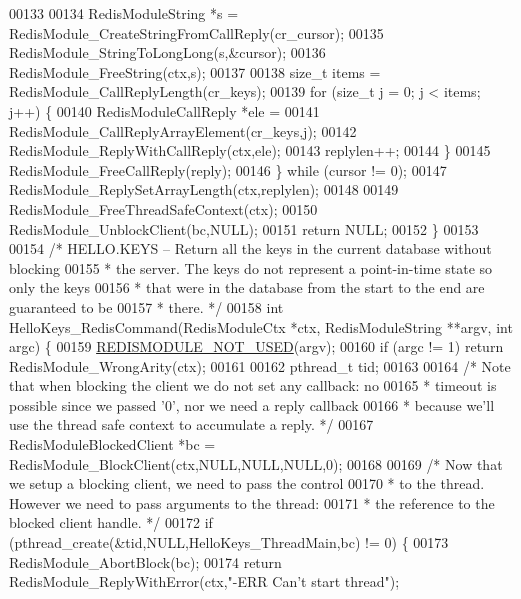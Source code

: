 \begin{DoxyCode}
00133 
00134         RedisModuleString *s = RedisModule\_CreateStringFromCallReply(cr\_cursor);
00135         RedisModule\_StringToLongLong(s,&cursor);
00136         RedisModule\_FreeString(ctx,s);
00137 
00138         size\_t items = RedisModule\_CallReplyLength(cr\_keys);
00139         \textcolor{keywordflow}{for} (size\_t j = 0; j < items; j++) \{
00140             RedisModuleCallReply *ele =
00141                 RedisModule\_CallReplyArrayElement(cr\_keys,j);
00142             RedisModule\_ReplyWithCallReply(ctx,ele);
00143             replylen++;
00144         \}
00145         RedisModule\_FreeCallReply(reply);
00146     \} \textcolor{keywordflow}{while} (cursor != 0);
00147     RedisModule\_ReplySetArrayLength(ctx,replylen);
00148 
00149     RedisModule\_FreeThreadSafeContext(ctx);
00150     RedisModule\_UnblockClient(bc,NULL);
00151     \textcolor{keywordflow}{return} NULL;
00152 \}
00153 
00154 \textcolor{comment}{/* HELLO.KEYS -- Return all the keys in the current database without blocking}
00155 \textcolor{comment}{ * the server. The keys do not represent a point-in-time state so only the keys}
00156 \textcolor{comment}{ * that were in the database from the start to the end are guaranteed to be}
00157 \textcolor{comment}{ * there. */}
00158 \textcolor{keywordtype}{int} HelloKeys\_RedisCommand(RedisModuleCtx *ctx, RedisModuleString **argv, \textcolor{keywordtype}{int} argc) \{
00159     \hyperlink{redismodule_8h_a46d75d81383a00bd6b941af6cadf64c2}{REDISMODULE\_NOT\_USED}(argv);
00160     \textcolor{keywordflow}{if} (argc != 1) \textcolor{keywordflow}{return} RedisModule\_WrongArity(ctx);
00161 
00162     pthread\_t tid;
00163 
00164     \textcolor{comment}{/* Note that when blocking the client we do not set any callback: no}
00165 \textcolor{comment}{     * timeout is possible since we passed '0', nor we need a reply callback}
00166 \textcolor{comment}{     * because we'll use the thread safe context to accumulate a reply. */}
00167     RedisModuleBlockedClient *bc = RedisModule\_BlockClient(ctx,NULL,NULL,NULL,0);
00168 
00169     \textcolor{comment}{/* Now that we setup a blocking client, we need to pass the control}
00170 \textcolor{comment}{     * to the thread. However we need to pass arguments to the thread:}
00171 \textcolor{comment}{     * the reference to the blocked client handle. */}
00172     \textcolor{keywordflow}{if} (pthread\_create(&tid,NULL,HelloKeys\_ThreadMain,bc) != 0) \{
00173         RedisModule\_AbortBlock(bc);
00174         \textcolor{keywordflow}{return} RedisModule\_ReplyWithError(ctx,\textcolor{stringliteral}{"-ERR Can't start thread"});

\end{DoxyCode}
